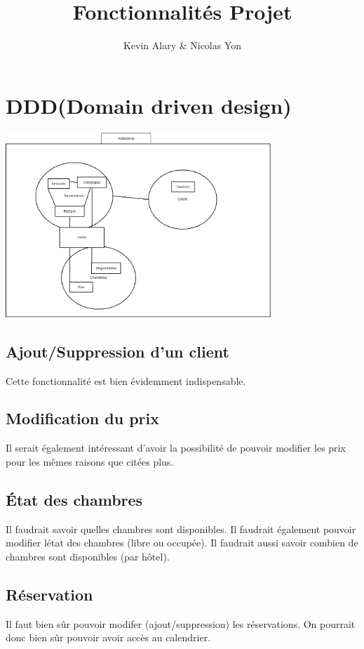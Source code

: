 \documentclass{article}
\title{Fonctionnalit\'es Projet}
\author{Kevin Alary \& Nicolas Yon}
\date{}
\begin{document}
\maketitle

\section{DDD(Domain driven design)}
\includegraphics[width=10cm]{ddd.png} \\


\subsection{Ajout/Suppression d'un client}
Cette fonctionnalit\'e est bien \'evidemment indispensable.

\subsection{Modification du prix}
Il serait \'egalement int\'eressant d'avoir la possibilit\'e de pouvoir modifier les prix pour les m\^{e}mes raisons que cit\'ees plus.


\subsection{\'Etat des chambres}
Il faudrait savoir quelles chambres sont disponibles. Il faudrait \'egalement pouvoir modifier l\'etat des chambres (libre ou occup\'ee). Il faudrait aussi savoir combien de chambres sont disponibles (par h\^{o}tel).

\subsection{R\'eservation}
Il faut bien s\^{u}r pouvoir modifer (ajout/suppression) les r\'eservations. On pourrait donc bien s\^{u}r pouvoir  avoir acc\`es au calendrier.
\end{document}
